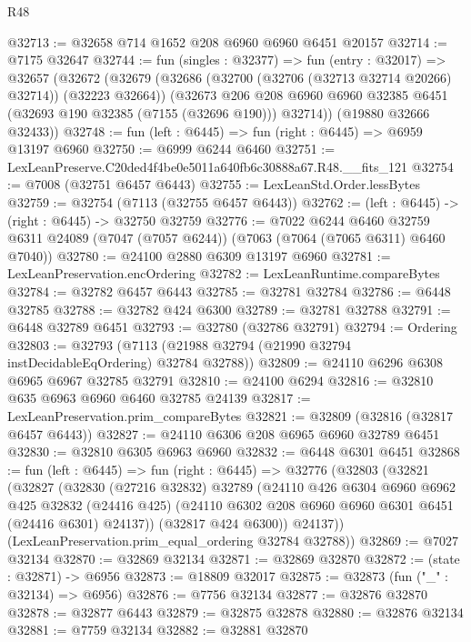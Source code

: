 \begin{lexlean}{R48}
\begin{coremodule}
@32713 := @32658 @714 @1652 @208 @6960 @6960 @6451 @20157
@32714 := @7175 @32647
@32744 := fun (singles : @32377) =>
  fun (entry : @32017) =>
  @32657
    (@32672
      (@32679
        (@32686 (@32700 (@32706 (@32713 @32714 @20266) @32714)) (@32223 @32664))
        (@32673
          @206
          @208
          @6960
          @6960
          @32385
          @6451
          (@32693 @190 @32385 (@7155 (@32696 @190)))
          @32714))
      (@19880 @32666 @32433))
@32748 := fun (left : @6445) => fun (right : @6445) => @6959 @13197 @6960
@32750 := @6999 @6244 @6460
@32751 := LexLeanPreserve.C20ded4f4be0e5011a640fb6c30888a67.R48.__fits_121
@32754 := @7008 (@32751 @6457 @6443)
@32755 := LexLeanStd.Order.lessBytes
@32759 := @32754 (@7113 (@32755 @6457 @6443))
@32762 := (left : @6445) -> (right : @6445) -> @32750 @32759
@32776 := @7022
    @6244
    @6460
    @32759
    @6311
    @24089
    (@7047 (@7057 @6244))
    (@7063 (@7064 (@7065 @6311) @6460 @7040))
@32780 := @24100 @2880 @6309 @13197 @6960
@32781 := LexLeanPreservation.encOrdering
@32782 := LexLeanRuntime.compareBytes
@32784 := @32782 @6457 @6443
@32785 := @32781 @32784
@32786 := @6448 @32785
@32788 := @32782 @424 @6300
@32789 := @32781 @32788
@32791 := @6448 @32789 @6451
@32793 := @32780 (@32786 @32791)
@32794 := Ordering
@32803 := @32793 (@7113 (@21988 @32794 (@21990 @32794 instDecidableEqOrdering) @32784 @32788))
@32809 := @24110 @6296 @6308 @6965 @6967 @32785 @32791
@32810 := @24100 @6294
@32816 := @32810 @635 @6963 @6960 @6460 @32785 @24139
@32817 := LexLeanPreservation.prim_compareBytes
@32821 := @32809 (@32816 (@32817 @6457 @6443))
@32827 := @24110 @6306 @208 @6965 @6960 @32789 @6451
@32830 := @32810 @6305 @6963 @6960
@32832 := @6448 @6301 @6451
@32868 := fun (left : @6445) =>
  fun (right : @6445) =>
  @32776
    (@32803
      (@32821
        (@32827
          (@32830
            (@27216 @32832)
            @32789
            (@24110
              @426
              @6304
              @6960
              @6962
              @425
              @32832
              (@24416 @425)
              (@24110 @6302 @208 @6960 @6960 @6301 @6451 (@24416 @6301) @24137))
            (@32817 @424 @6300))
          @24137))
      (LexLeanPreservation.prim_equal_ordering @32784 @32788))
@32869 := @7027 @32134
@32870 := @32869 @32134
@32871 := @32869 @32870
@32872 := (state : @32871) -> @6956
@32873 := @18809 @32017
@32875 := @32873 (fun ("_" : @32134) => @6956)
@32876 := @7756 @32134
@32877 := @32876 @32870
@32878 := @32877 @6443
@32879 := @32875 @32878
@32880 := @32876 @32134
@32881 := @7759 @32134
@32882 := @32881 @32870

\end{coremodule}
\end{lexlean}
